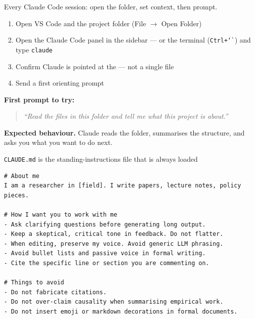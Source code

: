 \documentclass[aspectratio=169, 10pt]{beamer}
\begin{document}
\begin{frame}{Every Claude Code session: open the folder, set context, then prompt.}
\vskip0.2cm
\begin{enumerate}
  \item Open VS Code and the project folder (File $\to$ Open Folder)
  \item Open the Claude Code panel in the sidebar --- or the terminal (\texttt{Ctrl+\char`\`}) and type \texttt{claude}
  \item Confirm Claude is pointed at the  --- not a single file
  \item Send a first orienting prompt
\end{enumerate}

\vskip0.4cm
\textbf{First prompt to try:}
\begin{quote}
\itshape\color{mcknavy}
``Read the files in this folder and tell me what this project is about.''
\end{quote}

\vskip0.2cm
\textbf{Expected behaviour.} Claude reads the folder, summarises the structure, and asks you what you want to do next. 
\end{frame}


\begin{frame}[fragile]{\texttt{CLAUDE.md} is the standing-instructions file that is always loaded}
\vskip0.1cm
\small
\begin{verbatim}
# About me
I am a researcher in [field]. I write papers, lecture notes, policy pieces.

# How I want you to work with me
- Ask clarifying questions before generating long output.
- Keep a skeptical, critical tone in feedback. Do not flatter.
- When editing, preserve my voice. Avoid generic LLM phrasing.
- Avoid bullet lists and passive voice in formal writing.
- Cite the specific line or section you are commenting on.

# Things to avoid
- Do not fabricate citations.
- Do not over-claim causality when summarising empirical work.
- Do not insert emoji or markdown decorations in formal documents.
\end{verbatim}

\vskip0.2cm
\end{frame}
\end{document}
